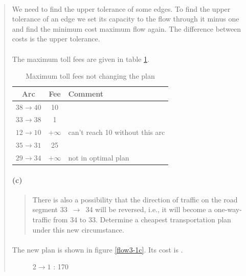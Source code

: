 \begin{quote}
\paragraph{}
We need to find the upper tolerance of some edges. To find the upper tolerance of an edge we set its capacity to the flow through it minus one and find the minimum cost maximum flow again. The difference between costs is the upper tolerance.

\paragraph{}
The maximum toll fees are given in table \ref{toll-fees}.

\begin{table}[H]
\centering
\begin{tabular}{|c|c|l|}
\hline
Arc & Fee & Comment \\ \hline
$ 38 \rightarrow 40 $ & 10 & \\ \hline
$ 33 \rightarrow 38 $ & 1 & \\ \hline
$ 12 \rightarrow 10 $ & $+\infty$ & can't reach 10 without this arc \\ \hline
$ 35 \rightarrow 31 $ & 25 & \\ \hline
$ 29 \rightarrow 34 $ & $+\infty$ & not in optimal plan \\ \hline
\end{tabular}
\caption{Maximum toll fees not changing the plan}
\label{toll-fees}
\end{table}

\paragraph{(c)}
\begin{quote}
There is also a possibility that the direction of traffic on the road segment 33~$\rightarrow$~34 will be reversed, i.e., it will become a one-way-traffic from 34 to 33. Determine a cheapest transportation plan under this new circumstance.
\end{quote}

\paragraph{}
The new plan is shown in figure \ref{flow3-1c}. Its cost is .

\begin{figure}[H]
\centering
\begin{multicols}{5}
$ 2 \rightarrow 1 $ : 170


\end{multicols}
\end{figure}
\end{quote}
